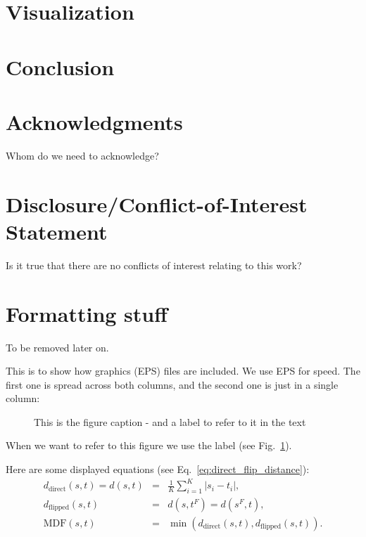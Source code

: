 \documentclass{bioinfo}
\begin{document}
\section{Visualization}

\section{Conclusion}


\section*{Acknowledgments}
Whom do we need to acknowledge?

\section*{Disclosure/Conflict-of-Interest Statement}
Is it true that there are no conflicts of interest relating to this
work?


\section*{Formatting stuff}

To be removed later on.

This is to show how graphics (EPS) files are included. We use EPS for
speed. The first one is spread across both columns, and the second one
is just in a single column:

\begin{figure}
\caption{This is the figure caption - and a label to refer to it in the text \label{Fig:big_picture}}

\end{figure}

When we want to refer to this figure we use the label (see
Fig.~\ref{Fig:big_picture}).


Here are some displayed equations (see Eq.~\ref{eq:direct_flip_distance}):
\begin{eqnarray}
  d_{\textrm{direct}}(s, t) = d(s, t) & = & \frac{1}{K}\sum_{i=1}^{K}|s_{i}-t_{i}|,\nonumber\\
  d_{\textrm{flipped}}(s, t) & = & d(s,t^F) = d(s^F,t),\nonumber\\
  \textrm{MDF}(s, t) & = & \min(d_{\textrm{direct}}(s, t), d_{\textrm{flipped}}(s, t))\label{eq:direct_flip_distance}.
\end{eqnarray}
\end{document}
